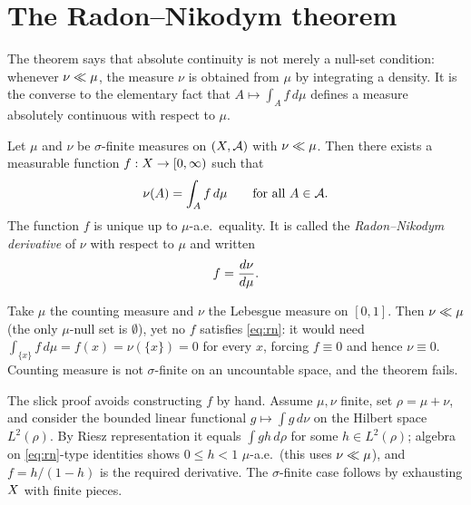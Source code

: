 \section{The Radon--Nikodym theorem}
\label{sec:radon-nikodym}

The theorem says that absolute continuity is not merely a null-set condition:
whenever $\nu \ll \mu$, the measure $\nu$ is obtained from $\mu$ by
integrating a density. It is the converse to the elementary fact that
$A \mapsto \int_A f\,d\mu$ defines a measure absolutely continuous with respect
to $\mu$.

\begin{theorem}
\label{thm:rn}
Let $\mu$ and $\nu$ be $\sigma$-finite measures on $(X, \mathcal{A})$ with
$\nu \ll \mu$. Then there exists a measurable function
$f : X \to [0, \infty)$ such that
\begin{equation}
  \nu(A) = \int_A f \, d\mu
  \qquad \text{for all } A \in \mathcal{A}.
  \label{eq:rn}
\end{equation}
The function $f$ is unique up to $\mu$-a.e.\ equality. It is called the
\emph{Radon--Nikodym derivative} of $\nu$ with respect to $\mu$ and written
\begin{equation}
  f = \frac{d \nu}{d \mu}.
\end{equation}
\end{theorem}

\begin{remark}
Take $\mu$ the counting measure and $\nu$ the Lebesgue measure on $[0,1]$. Then
$\nu \ll \mu$ (the only $\mu$-null set is $\emptyset$), yet no $f$
satisfies \eqref{eq:rn}: it would need $\int_{\{x\}} f\,d\mu = f(x) = \nu(\{x\})
= 0$ for every $x$, forcing $f \equiv 0$ and hence $\nu \equiv 0$. Counting
measure is not $\sigma$-finite on an uncountable space, and the theorem fails.
\end{remark}

\begin{remark}
The slick proof avoids constructing $f$ by hand. Assume $\mu, \nu$ finite, set
$\rho = \mu + \nu$, and consider the bounded linear functional
$g \mapsto \int g \, d\nu$ on the Hilbert space $L^2(\rho)$. By Riesz
representation it equals $\int g h \, d\rho$ for some $h \in L^2(\rho)$; algebra
on \eqref{eq:rn}-type identities shows $0 \le h < 1$ $\mu$-a.e.\ (this uses
$\nu \ll \mu$), and $f = h / (1 - h)$ is the required derivative. The
$\sigma$-finite case follows by exhausting $X$ with finite pieces.
\end{remark}

